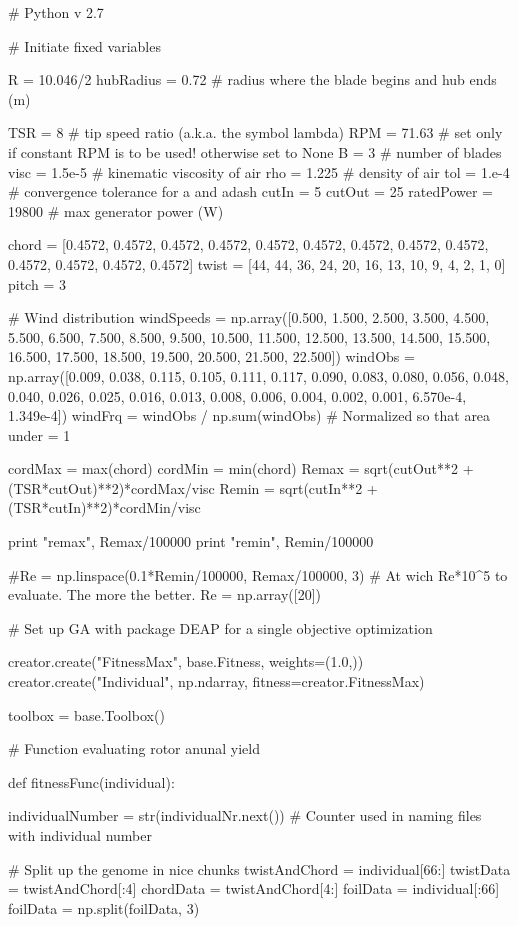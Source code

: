 \begin{pythoncode}
# Python v 2.7

# Initiate fixed variables

R = 10.046/2
hubRadius = 0.72 # radius where the blade begins and hub ends (m)

TSR = 8 # tip speed ratio (a.k.a. the symbol lambda)
RPM = 71.63 # set only if constant RPM is to be used! otherwise set to None
B = 3 # number of blades
visc = 1.5e-5 # kinematic viscosity of air 
rho = 1.225 # density of air 
tol = 1.e-4 # convergence tolerance for a and adash
cutIn = 5
cutOut = 25
ratedPower = 19800 # max generator power (W)

chord = [0.4572, 0.4572, 0.4572, 0.4572, 0.4572, 0.4572, 0.4572, 0.4572, 0.4572, 0.4572, 0.4572, 0.4572, 0.4572]
twist = [44, 44, 36, 24, 20, 16, 13, 10, 9, 4, 2, 1, 0] 
pitch = 3

# Wind distribution
windSpeeds = np.array([0.500, 1.500, 2.500, 3.500, 4.500, 5.500, 6.500, 7.500, 8.500, 9.500, 10.500, 11.500, 12.500, 13.500, 14.500, 15.500, 16.500, 17.500, 18.500, 19.500, 20.500, 21.500, 22.500])
windObs = np.array([0.009, 0.038, 0.115, 0.105, 0.111, 0.117, 0.090, 0.083, 0.080, 0.056, 0.048, 0.040, 0.026, 0.025, 0.016, 0.013, 0.008, 0.006, 0.004, 0.002, 0.001, 6.570e-4, 1.349e-4])
windFrq = windObs / np.sum(windObs) # Normalized so that area under = 1

cordMax = max(chord)
cordMin = min(chord)
Remax = sqrt(cutOut**2 + (TSR*cutOut)**2)*cordMax/visc
Remin = sqrt(cutIn**2 + (TSR*cutIn)**2)*cordMin/visc

print "remax", Remax/100000
print "remin", Remin/100000

#Re = np.linspace(0.1*Remin/100000, Remax/100000, 3) # At wich Re*10^5 to evaluate. The more the better.
Re = np.array([20])




# Set up GA with package DEAP for a single objective optimization

creator.create("FitnessMax", base.Fitness, weights=(1.0,))
creator.create("Individual", np.ndarray, fitness=creator.FitnessMax)

toolbox = base.Toolbox()

# Function evaluating rotor anunal yield

def fitnessFunc(individual):

    individualNumber = str(individualNr.next()) # Counter used in naming files with individual number

    # Split up the genome in nice chunks
    twistAndChord = individual[66:]
    twistData = twistAndChord[:4]
    chordData = twistAndChord[4:]
    foilData = individual[:66]
    foilData = np.split(foilData, 3) 
    

\end{pythoncode}
